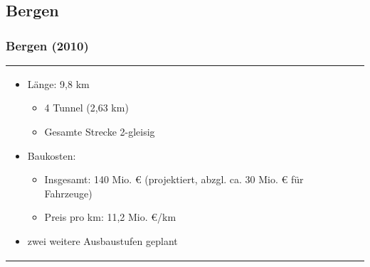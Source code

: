 \documentclass[xcolor=dvipsnames]{beamer}
\begin{document}

\subsection{Bergen}
\begin{frame}
  \frametitle{Bergen (2010)}

  \begin{tabular}{lc}
    \begin{minipage}{.6\linewidth}
      \begin{itemize}
      \item Länge: 9,8 km
        \begin{itemize}
        \item 4 Tunnel (2,63 km)
        \item Gesamte Strecke 2-gleisig
        \end{itemize}
      \item Baukosten:
        \begin{itemize}
        \item Insgesamt: 140 Mio. € (projektiert, abzgl. ca. 30
          Mio. € für Fahrzeuge)
        \item Preis pro km: 11,2 Mio. €/km
        \end{itemize}
      \item zwei weitere Ausbaustufen geplant
      \end{itemize}
    \end{minipage}
    &
    \begin{minipage}{.4\linewidth}

\end{minipage}
\end{tabular}
\end{frame}
\end{document}
